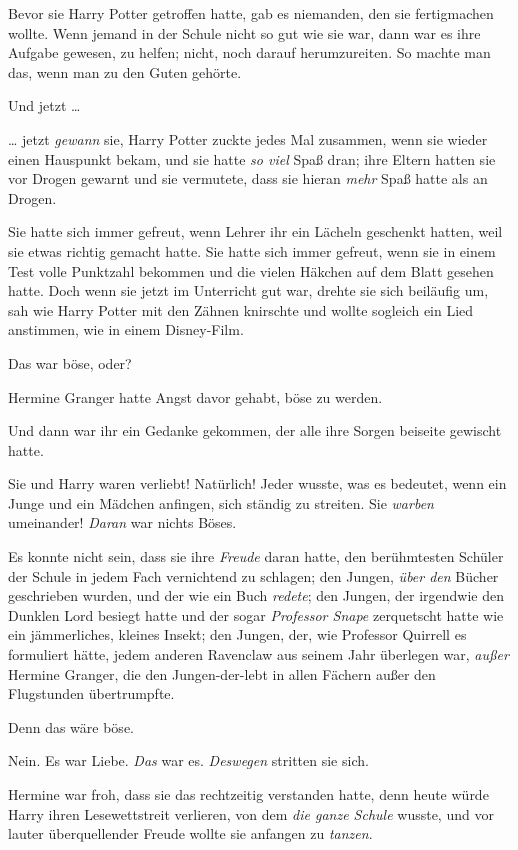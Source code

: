 {Bevor sie Harry Potter getroffen hatte, gab es niemanden, den sie fertigmachen wollte. Wenn jemand in der Schule nicht so gut wie sie war, dann war es ihre Aufgabe gewesen, zu helfen; nicht, noch darauf herumzureiten. So machte man das, wenn man zu den Guten gehörte.

Und jetzt …

… jetzt \emph{gewann} sie, Harry Potter zuckte jedes Mal zusammen, wenn sie wieder einen Hauspunkt bekam, und sie hatte \emph{so viel} Spaß dran; ihre Eltern hatten sie vor Drogen gewarnt und sie vermutete, dass sie hieran \emph{mehr} Spaß hatte als an Drogen.

Sie hatte sich immer gefreut, wenn Lehrer ihr ein Lächeln geschenkt hatten, weil sie etwas richtig gemacht hatte. Sie hatte sich immer gefreut, wenn sie in einem Test volle Punktzahl bekommen und die vielen Häkchen auf dem Blatt gesehen hatte. Doch wenn sie jetzt im Unterricht gut war, drehte sie sich beiläufig um, sah wie Harry Potter mit den Zähnen knirschte und wollte sogleich ein Lied anstimmen, wie in einem Disney-Film.

Das war böse, oder?

Hermine Granger hatte Angst davor gehabt, böse zu werden.

Und dann war ihr ein Gedanke gekommen, der alle ihre Sorgen beiseite gewischt hatte.

Sie und Harry waren verliebt! Natürlich! Jeder wusste, was es bedeutet, wenn ein Junge und ein Mädchen anfingen, sich ständig zu streiten. Sie \emph{warben} umeinander! \emph{Daran} war nichts Böses.

Es konnte nicht sein, dass sie ihre \emph{Freude} daran hatte, den berühmtesten Schüler der Schule in jedem Fach vernichtend zu schlagen; den Jungen, \emph{über den} Bücher geschrieben wurden, und der wie ein Buch \emph{redete}; den Jungen, der irgendwie den Dunklen Lord besiegt hatte und der sogar \emph{Professor Snape} zerquetscht hatte wie ein jämmerliches, kleines Insekt; den Jungen, der, wie Professor Quirrell es formuliert hätte, jedem anderen Ravenclaw aus seinem Jahr überlegen war, \emph{außer} Hermine Granger, die den Jungen-der-lebt in allen Fächern außer den Flugstunden übertrumpfte.

Denn das wäre böse.

Nein. Es war Liebe. \emph{Das} war es. \emph{Deswegen} stritten sie sich.

Hermine war froh, dass sie das rechtzeitig verstanden hatte, denn heute würde Harry ihren Lesewettstreit verlieren, von dem \emph{die ganze Schule} wusste, und vor lauter überquellender Freude wollte sie anfangen zu \emph{tanzen}.

}
